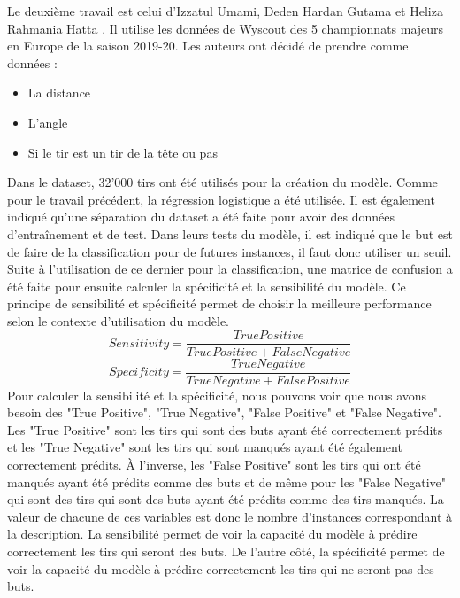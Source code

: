 \documentclass[12pt]{article}
\begin{document}
Le deuxième travail est celui d'Izzatul Umami, Deden Hardan Gutama et Heliza Rahmania Hatta \cite{umamiImplementingExpectedGoal2021}.
Il utilise les données de Wyscout des 5 championnats majeurs en Europe de la saison 2019-20.
Les auteurs ont décidé de prendre comme données :
\begin{itemize}
    \item La distance
    \item L'angle
    \item Si le tir est un tir de la tête ou pas
\end{itemize}
Dans le dataset, 32'000 tirs ont été utilisés pour la création du modèle.
Comme pour le travail précédent, la régression logistique a été utilisée.
Il est également indiqué qu'une séparation du dataset a été faite pour avoir des données d'entraînement et de test.
Dans leurs tests du modèle, il est indiqué que le but est de faire de la classification pour de futures instances, il faut donc utiliser un seuil.
Suite à l'utilisation de ce dernier pour la classification, une matrice de confusion a été faite pour ensuite calculer la spécificité et la sensibilité du modèle.
Ce principe de sensibilité et spécificité permet de choisir la meilleure performance selon le contexte d'utilisation du modèle.
\begin{equation}
    Sensitivity = \frac{True Positive}{True Positive + False Negative}
\end{equation}
\begin{equation}
    Specificity = \frac{True Negative}{True Negative + False Positive}
\end{equation}
Pour calculer la sensibilité et la spécificité, nous pouvons voir que nous avons besoin des "True Positive", "True Negative", "False Positive" et "False Negative".
Les "True Positive" sont les tirs qui sont des buts ayant été correctement prédits et les "True Negative" sont les tirs qui sont manqués ayant été également correctement prédits.
À l'inverse, les "False Positive" sont les tirs qui ont été manqués ayant été prédits comme des buts et de même pour les "False Negative" qui sont des tirs qui sont des buts ayant été prédits comme des tirs manqués.
La valeur de chacune de ces variables est donc le nombre d'instances correspondant à la description.
\newline \newline
La sensibilité permet de voir la capacité du modèle à prédire correctement les tirs qui seront des buts.
De l'autre côté, la spécificité permet de voir la capacité du modèle à prédire correctement les tirs qui ne seront pas des buts.
\end{document}
